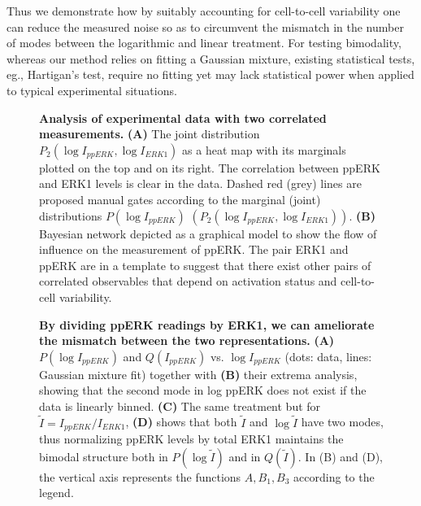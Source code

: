 \documentclass[11pt,a4paper,draft]{article}
\begin{document}
Thus we demonstrate how by suitably accounting for cell-to-cell variability one can reduce the measured noise so as to circumvent the mismatch in the number of modes between the logarithmic and linear treatment. For testing bimodality, whereas our method relies on fitting a Gaussian mixture, existing statistical tests, eg., Hartigan's test, require no fitting yet may lack statistical power when applied to typical experimental situations. 
\smallskip

\begin{figure}
    \centering
   \caption{\textbf{Analysis of experimental data with two correlated measurements.} \textbf{(A)} The joint distribution $P_2(\log I_{ppERK},\log I_{ERK1})$ as a heat map with its marginals plotted on the top and on its right. The correlation between ppERK and ERK1 levels is clear in the data. Dashed red (grey) lines are proposed manual gates according to the marginal (joint) distributions $P(\log I_{ppERK})$ $\left(P_2(\log I_{ppERK},\log I_{ERK1})\right)$. \textbf{(B)} Bayesian network depicted as a graphical model to show the flow of influence on the measurement of ppERK. The pair ERK1 and ppERK are in a template to suggest that there exist other pairs of correlated observables that depend on activation status and cell-to-cell variability.}
   \label{fig:ppERKvsERK1heatmap}
\end{figure}



\smallskip
\begin{figure}
 \centering
  \caption{\textbf{By dividing ppERK readings by ERK1, we can ameliorate the mismatch between the two representations.} \textbf{(A)} $P(\log I_{ppERK})$ and $Q(I_{ppERK})$ vs. $\log I_{ppERK}$ (dots: data, lines: Gaussian mixture fit) together with \textbf{(B)} their extrema analysis, showing that the second mode in log ppERK does not exist if the data is linearly binned. \textbf{(C)} The same treatment but for $\tilde{I} = I_{ppERK}/I_{ERK1}$, \textbf{(D)} shows that both $\tilde{I}$ and $\log \tilde{I}$ have two modes, thus normalizing ppERK levels by total ERK1 maintains the bimodal structure both in $P(\log \tilde{I})$ and in $Q(\tilde{I})$. In (B) and (D), the vertical axis represents the functions $A, B_1,B_3$ according to the legend.}
  \label{fig:NormppERKbyERK}
\end{figure}

\smallskip

\newpage
\end{document}
